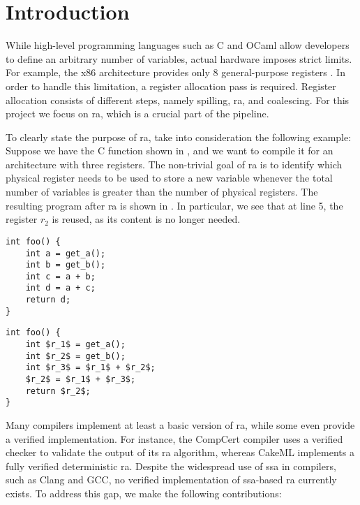 
\chapter{Introduction}
\label{cha:intro}

While high-level programming languages such as C and OCaml allow developers to define an arbitrary number of variables, actual hardware imposes strict limits. For example, the x86 architecture provides only 8 general-purpose registers \cite{intel-sdm-vol1}.
In order to handle this limitation, a register allocation pass is required. Register allocation consists of different steps, namely spilling, \gls{ra}, and coalescing. For this project we focus on \gls{ra}, which is a crucial part of the pipeline.

To clearly state the purpose of \gls{ra}, take into consideration the following example: Suppose we have the C function shown in , and we want to compile it for an architecture with three registers. The non-trivial goal of \gls{ra} is to identify which physical register needs to be used to store a new variable whenever the total number of variables is greater than the number of physical registers. The resulting program after \gls{ra} is shown in . In particular, we see that at line 5, the register $r_2$ is reused, as its content is no longer needed.

\begin{minipage}{0.48\linewidth}
\centering
\lstset{style=C}
\begin{lstlisting}[caption={C program returning $2a+b$.}, label={fig:cbefore}]
int foo() {
    int a = get_a();
    int b = get_b();
    int c = a + b;
    int d = a + c;
    return d;
}
\end{lstlisting}
\end{minipage}
\hfill
\begin{minipage}{0.48\linewidth}
\centering
\lstset{style=C}
\begin{lstlisting}[caption={Same C program after \gls{ra}.}, label={fig:cafter}]
int foo() {
    int $r_1$ = get_a();
    int $r_2$ = get_b();
    int $r_3$ = $r_1$ + $r_2$;
    $r_2$ = $r_1$ + $r_3$;
    return $r_2$;
}
\end{lstlisting}
\end{minipage}

Many compilers implement at least a basic version of \gls{ra}, while some even provide a verified implementation. For instance, the CompCert \cite{Rideau-Leroy-regalloc} compiler uses a verified checker to validate the output of its \gls{ra} algorithm, whereas CakeML \cite{10.1145/2578855.2535841} implements a fully verified deterministic \gls{ra}. Despite the widespread use of \gls{ssa} in compilers, such as Clang and GCC, no verified implementation of \gls{ssa}-based \gls{ra} currently exists. To address this gap, we make the following contributions:


